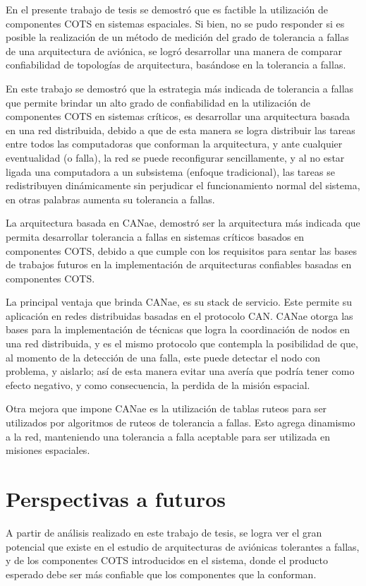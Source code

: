 En el presente trabajo de tesis se demostró que es factible la utilización de
componentes COTS en sistemas espaciales. Si bien, no se pudo responder si es
posible la realización de un método de medición del grado de tolerancia a
fallas de una arquitectura de aviónica, se logró desarrollar una manera
de comparar confiabilidad de topologías de arquitectura, basándose en la
tolerancia a fallas.

En este trabajo se demostró que la estrategia más indicada de tolerancia a
fallas que permite brindar un alto grado de confiabilidad en la utilización de
componentes COTS en sistemas críticos, es desarrollar una arquitectura basada en
una red distribuida, debido a que de esta manera se logra distribuir las tareas
entre todos las computadoras que conforman la arquitectura,
y ante cualquier eventualidad (o falla), la red se puede reconfigurar sencillamente,
y al no estar ligada una computadora a un subsistema (enfoque tradicional), las tareas
se redistribuyen dinámicamente sin perjudicar el funcionamiento normal
del sistema, en otras palabras aumenta su tolerancia a fallas.

La arquitectura basada en CANae, demostró ser la arquitectura más indicada que permita
desarrollar tolerancia a fallas en sistemas críticos basados en componentes COTS,
debido a que cumple con los requisitos para sentar las bases de trabajos futuros
en la implementación de arquitecturas confiables basadas en componentes COTS. 

La principal ventaja que brinda CANae, es su stack de servicio. Este permite su aplicación en redes distribuidas basadas en el protocolo CAN. CANae otorga las bases para la implementación de técnicas que logra la coordinación de nodos en una red distribuida, y es el mismo protocolo que contempla la posibilidad de que, al momento de la detección de una falla, este puede detectar el nodo con problema, y aislarlo; así de esta manera evitar una avería que podría tener como efecto negativo, y como consecuencia, la perdida de la misión espacial.

Otra mejora que impone CANae es la utilización de tablas ruteos para ser utilizados por algoritmos de ruteos de tolerancia a fallas. Esto agrega dinamismo a la red, manteniendo una tolerancia a falla aceptable para ser utilizada en misiones espaciales.

\section{Perspectivas a futuros}\label{chap:TrabajosFuturos}
A partir de análisis realizado en este trabajo de tesis, se logra ver el gran
potencial que existe en el estudio de arquitecturas de aviónicas tolerantes
a fallas, y de los componentes COTS introducidos en el sistema,
donde el producto esperado debe ser más confiable que los componentes
que la conforman.


